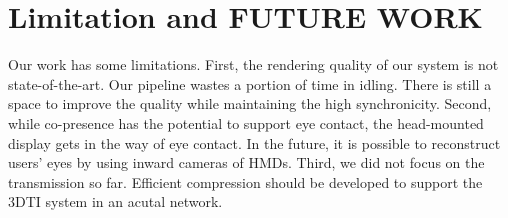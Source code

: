 \section{Limitation and FUTURE WORK}

Our work has some limitations. First, the rendering quality of our system is not state-of-the-art. Our pipeline wastes a portion of time in idling. There is still a space to improve the quality while maintaining the high synchronicity. Second, while co-presence has the potential to support eye contact, the head-mounted display gets in the way of eye contact. In the future, it is possible to reconstruct users' eyes by using inward cameras of HMDs. Third, we did not focus on the transmission so far. Efficient compression should be developed to support the 3DTI system in an acutal network.
